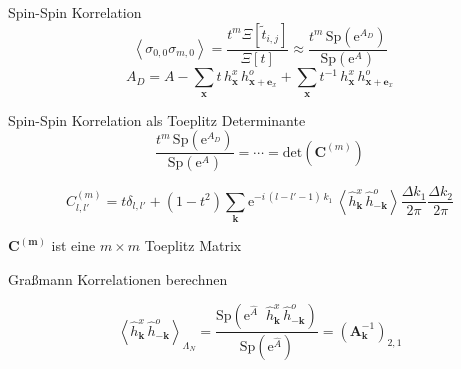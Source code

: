 \documentclass[11pt]{beamer}
\newcommand{\corr}[1]{\left\langle #1 \right\rangle}
\newcommand{\Sp}[1]{\mathrm{Sp}\left( #1 \right)}
\renewcommand{\det}[1]{\mathrm{det}\left( #1 \right)}
\begin{document}
    \begin{frame}{Spin-Spin Korrelation}
    \begin{equation} \nonumber
        \corr{\sigma_{0,0} \sigma_{m,0}}  = \frac{t^m \Xi[\tilde{t}_{i,j}]}{\Xi[t]}  \approx \frac{t^m \, \Sp{\mathrm{e}^{A_D}}}{\Sp{\mathrm{e}^A}} 
    \end{equation}
    \vspace{0.5cm}
    \begin{equation} \nonumber
        A_D = A - \sum_{\bm{x}} t\, h_{\bm{x}}^x\, h_{\bm{x} + \bm{e}_x}^o + \sum_{\bm{x}} t^{-1}\, h_{\bm{x}}^x\, h_{\bm{x} + \bm{e}_x}^o
    \end{equation}
    
    \vspace{0.5cm}

    
    \end{frame}

    \begin{frame}{Spin-Spin Korrelation als Toeplitz Determinante}
        \begin{equation} \nonumber
            \frac{t^m \, \Sp{\mathrm{e}^{A_D}}}{\Sp{\mathrm{e}^A}} = \cdots = \det{\bm{C}^{(m)}} 
        \end{equation}

        \begin{grayframe}
         \vspace{0.2cm}
        \begin{equation} \nonumber
            C_{l,l'}^{(m)} = t \delta_{l,l'} + (1-t^2)\sum_{\bm{k}}  \mathrm{e}^{-i\,(l-l'-1) \,k_1} \,\corr{\hat{h}_{\bm{k}}^{x}\, \hat{h}_{-\bm{k}}^{o}} \frac{\Delta k_1}{2\pi}\frac{\Delta k_2}{2\pi} %
        \end{equation}
        \end{grayframe}
        
        \vspace{0.1cm}
        \vspace{0.5cm}
        \centering
        $\bm{C^{(m)}}$ ist eine $m\times m$ 
        Toeplitz Matrix
    \end{frame}

    \begin{frame}{Graßmann Korrelationen berechnen}
    
    \begin{equation} \nonumber
    \corr{\hat{h}_{\bm{k}}^{x}\, \hat{h}_{-\bm{k}}^{o}}_{\Lambda_N} = \frac{\Sp{\mathrm{e}^{\hat{A}}\;\;\hat{h}_{\bm{k}}^{x}\, \hat{h}_{-\bm{k}}^{o}}}{\Sp{\mathrm{e}^{\hat{A}}}} = \left(\bm{A}_{\bm{k}}^{-1}\right)_{2,1} 
    \end{equation} 
    \end{frame}
\end{document}
